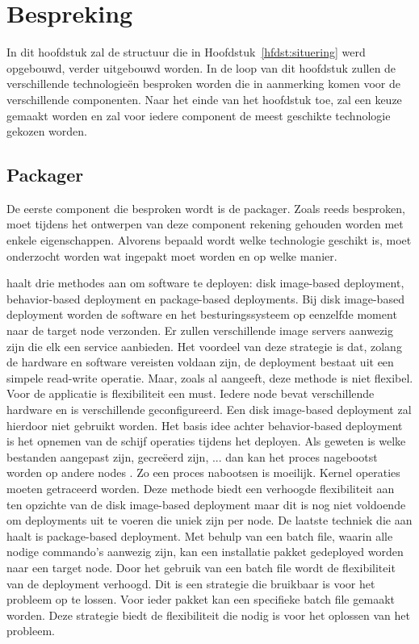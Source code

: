 \chapter{Bespreking}\label{hfdst:bespreking}
In dit hoofdstuk zal de structuur die in Hoofdstuk~\vref{hfdst:situering} werd opgebouwd, verder uitgebouwd worden.
In de loop van dit hoofdstuk zullen de verschillende technologieën besproken worden die in aanmerking komen voor de verschillende componenten.
Naar het einde van het hoofdstuk toe, zal een keuze gemaakt worden en zal voor iedere component de meest geschikte technologie gekozen worden.

\section{Packager}
De eerste component die besproken wordt is de packager.
Zoals reeds besproken, moet tijdens het ontwerpen van deze component rekening gehouden worden met enkele eigenschappen.
Alvorens bepaald wordt welke technologie geschikt is, moet onderzocht worden wat ingepakt moet worden en op welke manier.

\citet{deploymentMethods} haalt drie methodes aan om software te deployen: disk image-based deployment, behavior-based deployment en package-based deployments.
Bij disk image-based deployment worden de software en het besturingssysteem op eenzelfde moment naar de target node verzonden.
Er zullen verschillende image servers aanwezig zijn die elk een service aanbieden.
Het voordeel van deze strategie is dat, zolang de hardware en software vereisten voldaan zijn, de deployment bestaat uit een simpele read-write operatie.
Maar, zoals \citet{deploymentMethods} al aangeeft, deze methode is niet flexibel.
Voor de applicatie is flexibiliteit een must.
Iedere node bevat verschillende hardware en is verschillende geconfigureerd.
Een disk image-based deployment zal hierdoor niet gebruikt worden.
Het basis idee achter behavior-based deployment is het opnemen van de schijf operaties tijdens het deployen.
Als geweten is welke bestanden aangepast zijn, gecreëerd zijn, ... dan kan het proces nagebootst worden op andere nodes \citep{deploymentMethods}.
Zo een proces nabootsen is moeilijk.
Kernel operaties moeten getraceerd worden.
Deze methode biedt een verhoogde flexibiliteit aan ten opzichte van de disk image-based deployment maar dit is nog niet voldoende om deployments uit te voeren die uniek zijn per node.
De laatste techniek die \citet{deploymentMethods} aan haalt is package-based deployment.
Met behulp van een batch file, waarin alle nodige commando's aanwezig zijn, kan een installatie pakket gedeployed worden naar een target node.
Door het gebruik van een batch file wordt de flexibiliteit van de deployment verhoogd.
Dit is een strategie die bruikbaar is voor het probleem op te lossen.
Voor ieder pakket kan een specifieke batch file gemaakt worden.
Deze strategie biedt de flexibiliteit die nodig is voor het oplossen van het probleem.

